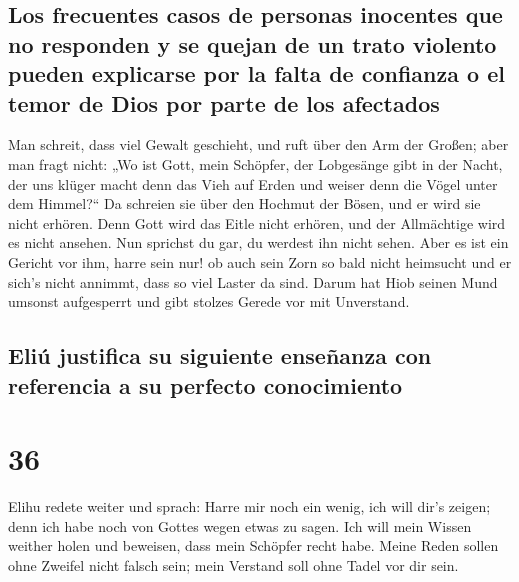 \hypertarget{los-frecuentes-casos-de-personas-inocentes-que-no-responden-y-se-quejan-de-un-trato-violento-pueden-explicarse-por-la-falta-de-confianza-o-el-temor-de-dios-por-parte-de-los-afectados}{%
\subsection{Los frecuentes casos de personas inocentes que no responden
y se quejan de un trato violento pueden explicarse por la falta de
confianza o el temor de Dios por parte de los
afectados}\label{los-frecuentes-casos-de-personas-inocentes-que-no-responden-y-se-quejan-de-un-trato-violento-pueden-explicarse-por-la-falta-de-confianza-o-el-temor-de-dios-por-parte-de-los-afectados}}

 Man schreit, dass viel Gewalt geschieht, und ruft über
den Arm der Großen;  aber man fragt nicht: „Wo ist Gott,
mein Schöpfer, der Lobgesänge gibt in der Nacht,  der uns
klüger macht denn das Vieh auf Erden und weiser denn die Vögel unter dem
Himmel?{}``  Da schreien sie über den Hochmut der Bösen,
und er wird sie nicht erhören.  Denn Gott wird das Eitle
nicht erhören, und der Allmächtige wird es nicht ansehen.
 Nun sprichst du gar, du werdest ihn nicht sehen. Aber es
ist ein Gericht vor ihm, harre sein nur!  ob auch sein
Zorn so bald nicht heimsucht und er sich's nicht annimmt, dass so viel
Laster da sind.  Darum hat Hiob seinen Mund umsonst
aufgesperrt und gibt stolzes Gerede vor mit Unverstand.

\hypertarget{eliuxfa-justifica-su-siguiente-enseuxf1anza-con-referencia-a-su-perfecto-conocimiento}{%
\subsection{Eliú justifica su siguiente enseñanza con referencia a su
perfecto
conocimiento}\label{eliuxfa-justifica-su-siguiente-enseuxf1anza-con-referencia-a-su-perfecto-conocimiento}}

\hypertarget{section-35}{%
\section{36}\label{section-35}}

 Elihu redete weiter und sprach:  Harre mir
noch ein wenig, ich will dir's zeigen; denn ich habe noch von Gottes
wegen etwas zu sagen.  Ich will mein Wissen weither holen
und beweisen, dass mein Schöpfer recht habe.  Meine Reden
sollen ohne Zweifel nicht falsch sein; mein Verstand soll ohne Tadel vor
dir sein.


